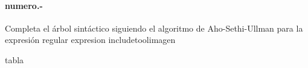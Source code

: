 

\paragraph{{numero}.-}\label{p{numero}}
Completa el árbol sintáctico siguiendo el algoritmo de Aho-Sethi-Ullman para la expresión regular {expresion}
    {includetool}{{imagen}}
    
{tabla}
